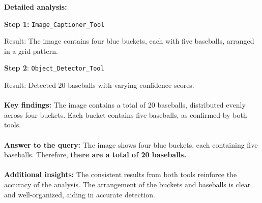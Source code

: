 \begin{answerbox}
\textbf{Detailed analysis:}

\quad\textbf{Step 1:} \texttt{Image\_Captioner\_Tool}

\quad\quad\quad\quad Result: The image contains four blue buckets, each with five baseballs, arranged in a grid pattern.
   
\quad\textbf{Step 2}: \texttt{Object\_Detector\_Tool}

\quad\quad\quad\quad Result: Detected 20 baseballs with varying confidence scores.
\\\\
\textbf{Key findings:}
The image contains a total of 20 baseballs, distributed evenly across four buckets.
Each bucket contains five baseballs, as confirmed by both tools.
\\\\
\textbf{Answer to the query:}
The image shows four blue buckets, each containing five baseballs. Therefore, \textbf{there are a total of 20 baseballs.}
\\\\
\textbf{Additional insights:}
The consistent results from both tools reinforce the accuracy of the analysis.
The arrangement of the buckets and baseballs is clear and well-organized, aiding in accurate detection.
\end{answerbox}

